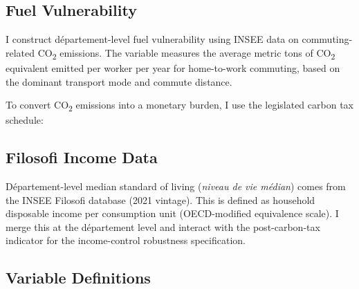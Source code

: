 \documentclass[12pt]{article}
\newcommand{\dept}{d\'{e}partement}
\newcommand{\Dept}{D\'{e}partement}
\begin{document}
\subsection{Fuel Vulnerability}

I construct \dept{}-level fuel vulnerability using INSEE data on commuting-related CO\textsubscript{2} emissions. The variable measures the average metric tons of CO\textsubscript{2} equivalent emitted per worker per year for home-to-work commuting, based on the dominant transport mode and commute distance.

To convert CO\textsubscript{2} emissions into a monetary burden, I use the legislated carbon tax schedule:



\subsection{Filosofi Income Data}

\Dept{}-level median standard of living (\textit{niveau de vie m\'{e}dian}) comes from the INSEE Filosofi database (2021 vintage). This is defined as household disposable income per consumption unit (OECD-modified equivalence scale). I merge this at the \dept{} level and interact with the post-carbon-tax indicator for the income-control robustness specification.

\subsection{Variable Definitions}
\end{document}

